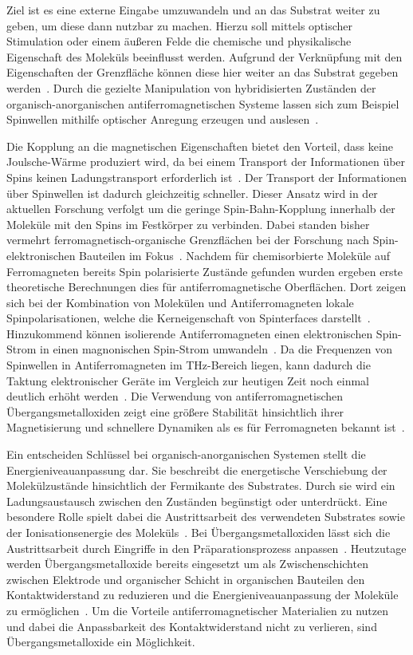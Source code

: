     Ziel ist es eine externe Eingabe umzuwandeln und an das Substrat weiter zu geben, um diese dann nutzbar zu machen.
    Hierzu soll mittels optischer Stimulation oder einem äußeren Felde die chemische und physikalische Eigenschaft des Moleküls beeinflusst werden.
    Aufgrund der Verknüpfung mit den Eigenschaften der Grenzfläche können diese hier weiter an das Substrat gegeben werden~\cite{IF_16}.
    Durch die gezielte Manipulation von hybridisierten Zuständen der organisch-anorganischen antiferromagnetischen Systeme lassen sich zum Beispiel Spinwellen mithilfe optischer Anregung erzeugen und auslesen~\cite{SINFONIA}.

    Die Kopplung an die magnetischen Eigenschaften bietet den Vorteil, dass keine Joulsche-Wärme produziert wird, da bei einem Transport der Informationen über Spins keinen Ladungstransport erforderlich ist~\cite{AFM_3}.
    Der Transport der Informationen über Spinwellen ist dadurch gleichzeitig schneller.
    Dieser Ansatz wird in der aktuellen Forschung verfolgt um die geringe Spin-Bahn-Kopplung innerhalb der Moleküle mit den Spins im Festkörper zu verbinden.
    Dabei standen bisher vermehrt ferromagnetisch-organische Grenzflächen bei der Forschung nach Spin-elektronischen Bauteilen im Fokus~\cite{ma-DJ, AFM_5}.
    Nachdem für chemisorbierte Moleküle auf Ferromagneten bereits Spin polarisierte Zustände gefunden wurden \cite{IF_16} ergeben erste theoretische Berechnungen dies für antiferromagnetische Oberflächen.
    Dort zeigen sich bei der Kombination von Molekülen und Antiferromagneten lokale Spinpolarisationen, welche die Kerneigenschaft von Spinterfaces darstellt~\cite{AFM_2}.
    Hinzukommend können isolierende Antiferromagneten einen elektronischen Spin-Strom in einen magnonischen Spin-Strom umwandeln~\cite{AFM_1}.
    Da die Frequenzen von Spinwellen in Antiferromagneten im \si{\tera\hertz}-Bereich liegen, kann dadurch die Taktung elektronischer Geräte im Vergleich zur heutigen Zeit noch einmal deutlich erhöht werden~\cite{AFM_5}.
    Die Verwendung von antiferromagnetischen Übergangsmetalloxiden zeigt eine größere Stabilität hinsichtlich ihrer Magnetisierung und schnellere Dynamiken als es für Ferromagneten bekannt ist~\cite{AFM_1}.

    Ein entscheiden Schlüssel bei organisch-anorganischen Systemen stellt die Energieniveauanpassung dar.
    Sie beschreibt die energetische Verschiebung der Molekülzustände hinsichtlich der Fermikante des Substrates.
    Durch sie wird ein Ladungsaustausch zwischen den Zuständen begünstigt oder unterdrückt.
    Eine besondere Rolle spielt dabei die Austrittsarbeit des verwendeten Substrates sowie der Ionisationsenergie des Moleküls~\cite{5A_3}.
    Bei Übergangsmetalloxiden lässt sich die Austrittsarbeit durch Eingriffe in den Präparationsprozess anpassen~\cite{5A_4}.
    Heutzutage werden Übergangsmetalloxide bereits eingesetzt um als Zwischenschichten zwischen Elektrode und organischer Schicht in organischen Bauteilen den Kontaktwiderstand zu reduzieren und die Energieniveauanpassung der Moleküle zu ermöglichen~\cite{IF_11}.
    Um die Vorteile antiferromagnetischer Materialien zu nutzen und dabei die Anpassbarkeit des Kontaktwiderstand nicht zu verlieren, sind Übergangsmetalloxide ein Möglichkeit.

